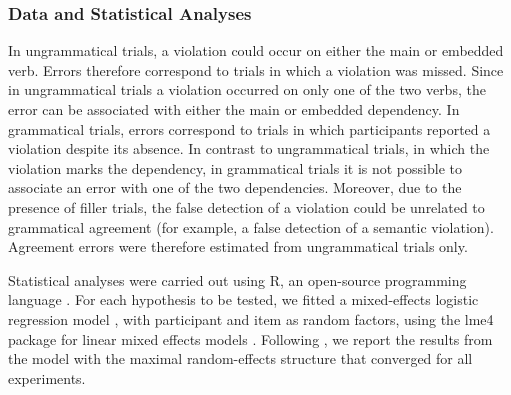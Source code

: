 \subsubsection{Data and Statistical Analyses}
In ungrammatical trials, a violation could occur on either the main or embedded verb. Errors therefore correspond to trials in which a violation was missed. Since in ungrammatical trials a violation occurred on only one of the two verbs, the error can be associated with either the main or embedded dependency. In grammatical trials, errors correspond to trials in which participants reported a violation despite its absence. In contrast to ungrammatical trials, in which the violation marks the dependency, in grammatical trials it is not possible to associate an error with one of the two dependencies. Moreover, due to the presence of filler trials, the false detection of a violation could be unrelated to grammatical agreement (for example, a false detection of a semantic violation). Agreement errors were therefore estimated from ungrammatical trials only.

Statistical analyses were carried out using R, an open-source programming language \citep{R}. For each hypothesis to be tested, we fitted a mixed-effects logistic regression model \citep{Jaeger2008}, with participant and item as random factors, using the lme4 package for linear mixed effects models \citep{Bates}. Following \citet{Baayen:etal:2008}, we report the results from the model with the maximal random-effects structure that converged for all experiments. 


